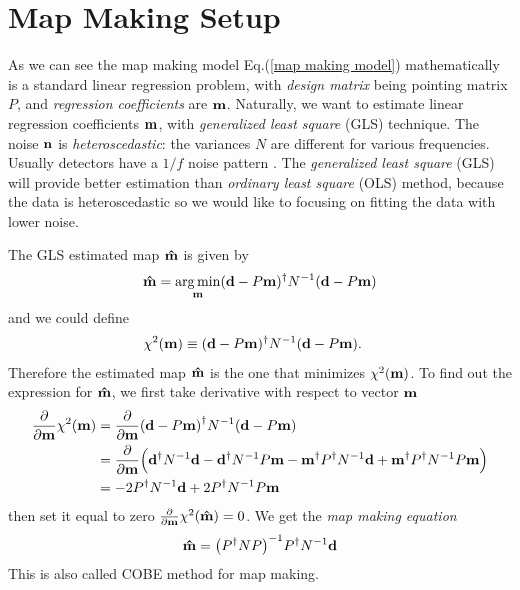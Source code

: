 \documentclass[11pt, letterpaper]{article}
\DeclareMathOperator*{\argmin}{arg\,min}
\newcommand{\vbd}{\vb{d}}
\newcommand{\vbm}{\vb{m}}
\newcommand{\vbn}{\vb{n}}
\newcommand{\inv}[1]{#1^{-1}}
\newcommand{\hatm}{\vb{\hat{m}}}
\newcommand{\Pdagger}{P^{\dagger}}
\newcommand{\PPinv}[1]{\inv{\qty(\Pdagger #1 P)}}
\begin{document}
\section{Map Making Setup}
As we can see the map making model Eq.(\ref{map making model}) mathematically 
is a standard linear regression problem,
with \textit{design matrix} being pointing matrix $P$, and \textit{regression
coefficients} are $\vbm$.
Naturally, we want to estimate linear regression coefficients $\vbm$,
with \textit{generalized least square} (GLS) technique.
The noise $\vbn$ is \textit{heteroscedastic}: the variances $N$ are 
different for various frequencies.  Usually detectors have a $1/f$ noise pattern
\cite{1997PhRvD..56.4514T}.
The \textit{generalized least square} (GLS) will provide better estimation 
than \textit{ordinary least square} (OLS) method, because the data is
heteroscedastic so we would like to focusing on fitting the data with lower 
noise.

The GLS estimated map $\hatm$ is given by
\begin{equation}
\hatm = \argmin_{\vbm} (\vbd - P\vbm)^{\dagger} N^{-1} (\vbd - P \vbm) 
\label{GLS estimator equation}
\end{equation}
and we could define 
\begin{align}
\chi^2(\vbm) & \equiv (\vbd - P\vbm)^{\dagger} N^{-1} (\vbd - P \vbm).
\label{chi2 formula}
\end{align}
Therefore the estimated map $\hatm$ is the one that minimizes $\chi^2(\vbm)$.
To find out the expression for $\hatm$, we first take derivative with respect to 
vector $\vbm$
\begin{align}
\begin{aligned}[b]
\pdv{\vbm} \chi^2(\vbm)
&= \pdv{\vbm} (\vbd - P\vbm)^{\dagger} N^{-1} (\vbd - P \vbm)
\\
&= \pdv{\vbm} \qty\Big(
    \vbd^{\dagger} N^{-1} \vbd 
    - \vbd^{\dagger} N^{-1} P \vbm 
    - \vbm^{\dagger}\Pdagger N^{-1}\vbd 
    + \vbm^{\dagger} \Pdagger N^{-1}P\vbm
)
\\
&= -2\Pdagger N^{-1} \vbd + 2 \Pdagger N^{-1} P \vbm
\label{dchi2/dm}
\end{aligned}
\end{align}
then set it equal to zero $\pdv{\vbm} \chi^2(\hatm) = 0$.
We get the \textit{map making equation}
\begin{align}
\hatm = \PPinv{N} \Pdagger \inv{N} \vbd \label{map making equation}
\end{align}
This is also called COBE method for map making.
\end{document}
